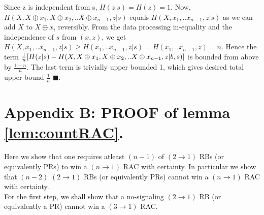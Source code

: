 Since z is independent from s, $H(z|s)=H(z)=1$. Now, $H(X,X\oplus x_{1},X\oplus x_{2},..X\oplus x_{n-1},z|s)$ equals $H(X, x_{1},.. x_{n-1},z|s)$ as we can add $X$ to $X\oplus x_i$ reversibly. From the data processing in-equality and the independence of $s$ from $(x,z)$, we get $H(X, x_{1},.. x_{n-1},z|s)\geq H( x_{1},.. x_{n-1},z|s)=H( x_{1},.. x_{n-1},z)=n$. Hence the term  $\frac{1}{n}[H(z|s)\\-H(X,X\oplus x_1,X\oplus x_2,..X\oplus x_{n-1},z|b,s)]$ is bounded from above by $\frac{1-n}{n}$. The last term is trivially upper bounded 1, which gives desired total upper bound $\frac{1}{n}$ $\blacksquare$.
\section*{Appendix B: PROOF of lemma \ref{lem:countRAC}.}
Here we show that one requires atleast $(n-1)$ of $(2\rightarrow 1)$ RBs (or equivalently PRs) to win a $(n\rightarrow 1)$ RAC with certainty. In particular we show that $(n-2)$ $(2\rightarrow 1)$ RBs (or equivalently PRs) cannot win a $(n\rightarrow 1)$ RAC with certainty. \\

For the first step, we shall show that a no-signaling $(2\rightarrow 1)$ RB (or equivalently a PR) cannot win a $(3\rightarrow 1)$ RAC.


